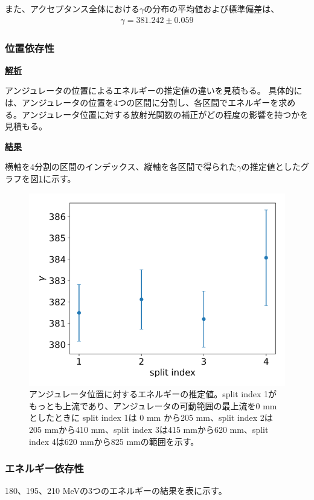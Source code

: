 \documentclass[a4paper,11pt,uplatex]{jsbook}
\begin{document}
また、アクセプタンス全体における$\gamma$の分布の平均値および標準偏差は、
\begin{eqnarray}
  \gamma = 381.242 \pm 0.059
\end{eqnarray}

\subsubsection{位置依存性}
\noindent \textbf{\underline{解析}}\par
アンジュレータの位置によるエネルギーの推定値の違いを見積もる。
具体的には、アンジュレータの位置を4つの区間に分割し、各区間でエネルギーを求める。アンジュレータ位置に対する放射光関数の補正がどの程度の影響を持つかを見積もる。

\noindent \textbf{\underline{結果}}\par
横軸を4分割の区間のインデックス、縦軸を各区間で得られた$\gamma$の推定値としたグラフを図\ref{posdep}に示す。
\begin{figure}[h]
  \centering
  \includegraphics[width=0.8\linewidth]{image/4-posdep.png}
  \caption[アンジュレータ位置に対するエネルギーの推定値]{アンジュレータ位置に対するエネルギーの推定値。split index 1がもっとも上流であり、アンジュレータの可動範囲の最上流を0 mm としたときに
  split index 1は 0 mm から205 mm、split index 2は205 mmから410 mm、split index 3は415 mmから620 mm、split index 4は620 mmから825 mmの範囲を示す。}\label{posdep}
\end{figure}

\subsubsection{エネルギー依存性}
180、195、210 MeVの3つのエネルギーの結果を表に示す。
\end{document}

